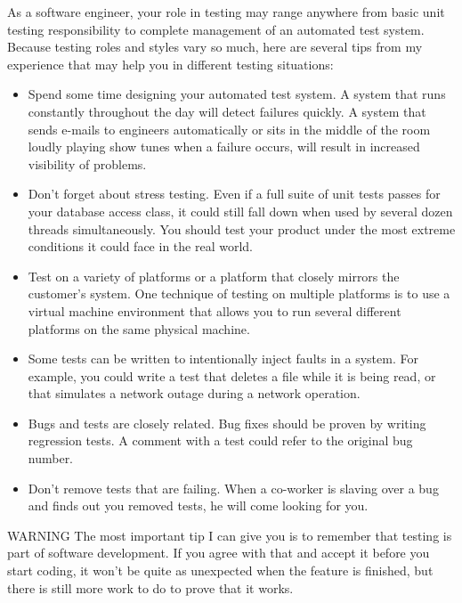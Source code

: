 As a software engineer, your role in testing may range anywhere from basic unit testing responsibility to complete management of an automated test system. Because testing roles and styles vary so much, here are several tips from my experience that may help you in different testing situations:

\begin{itemize}
\item
Spend some time designing your automated test system. A system that runs constantly throughout the day will detect failures quickly. A system that sends e-mails to engineers automatically or sits in the middle of the room loudly playing show tunes when a failure occurs, will result in increased visibility of problems.

\item
Don’t forget about stress testing. Even if a full suite of unit tests passes for your database access class, it could still fall down when used by several dozen threads simultaneously. You should test your product under the most extreme conditions it could face in the real world.

\item
Test on a variety of platforms or a platform that closely mirrors the customer’s system. One technique of testing on multiple platforms is to use a virtual machine environment that allows you to run several different platforms on the same physical machine.

\item
Some tests can be written to intentionally inject faults in a system. For example, you could write a test that deletes a file while it is being read, or that simulates a network outage during a network operation.

\item
Bugs and tests are closely related. Bug fixes should be proven by writing regression tests. A comment with a test could refer to the original bug number.

\item
Don’t remove tests that are failing. When a co-worker is slaving over a bug and finds out you removed tests, he will come looking for you.
\end{itemize}

\begin{myWarning}{WARNING}
The most important tip I can give you is to remember that testing is part of software development. If you agree with that and accept it before you start coding, it won’t be quite as unexpected when the feature is finished, but there is still more work to do to prove that it works.
\end{myWarning}